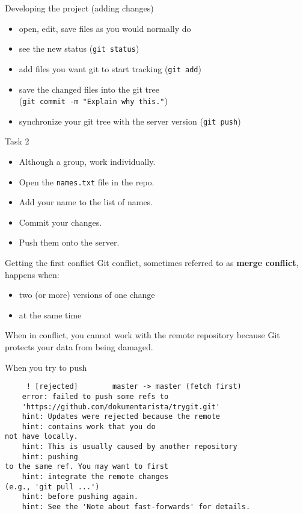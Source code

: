 \documentclass[14pt]{beamer}
\begin{document}
	\begin{frame}{Developing the project (adding changes)}
		\begin{itemize}
		\item open, edit, save files as you would normally do
		\item see the new status (\texttt{git status})
		\item add files you want git to start tracking (\texttt{git add})
		\item save the changed files into the git tree \\ (\texttt{git commit -m "Explain why this."})
		\item synchronize your git tree with the server version (\texttt{git push})
		\end{itemize}
	\end{frame}

	\begin{frame}{Task 2}
	\begin{itemize}
		\item Although a group, work individually.
		\item Open the \texttt{names.txt} file in the repo.
		\item Add your name to the list of names.
		\item Commit your changes.
		\item Push them onto the server.
	\end{itemize}
	\end{frame}

	\begin{frame}{Getting the first conflict}
	Git conflict, sometimes referred to as \textbf{merge conflict}, happens when:
	
	\vspace{5pt}
	
	\begin{itemize}
		\item two (or more) versions of one change
		\item at the same time
	\end{itemize}

	\vspace{5pt}
	
	When in conflict, you cannot work with the remote repository because Git protects your data from being damaged.

\end{frame}

	\begin{frame}[fragile]{When you try to push}
	\begin{verbatim}
	 ! [rejected]        master -> master (fetch first)
	error: failed to push some refs to 
	'https://github.com/dokumentarista/trygit.git'
	hint: Updates were rejected because the remote 
	hint: contains work that you do
not have locally. 
	hint: This is usually caused by another repository 
	hint: pushing
to the same ref. You may want to first 
	hint: integrate the remote changes
(e.g., 'git pull ...')
	hint: before pushing again.
	hint: See the 'Note about fast-forwards' for details.
	\end{verbatim}
	\end{frame}
\end{document}
